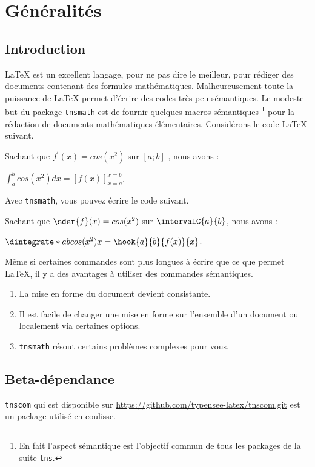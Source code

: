 \documentclass[12pt,a4paper]{book}
\begin{document}
\chapter{Généralités}

\section{Introduction}

\LaTeX{} est un excellent langage, pour ne pas dire le meilleur, pour rédiger des documents contenant des formules mathématiques.
Malheureusement toute la puissance de \LaTeX{} permet d'écrire des codes très peu sémantiques.
Le modeste but du package \verb+tnsmath+ est de fournir quelques macros sémantiques
\footnote{
	En fait l'aspect sémantique est l'objectif commun de tous les packages de la suite \texttt{tns}.
}
pour la rédaction de documents mathématiques élémentaires. Considérons le code \LaTeX{} suivant.

\begin{latexex-alone}
Sachant que $f^\prime(x) = cos(x^2)$ sur $[a ; b]$ , nous avons :

$\displaystyle \int_a^b cos(x^2) dx = \left[ f(x) \right]_{x=a}^{x=b}$.
\end{latexex-alone}


Avec \verb+tnsmath+, vous pouvez écrire le code suivant.

\begin{latexex-alone}
Sachant que $\sder{f}(x) = cos(x^2)$ sur $\intervalC{a}{b}$, nous avons :

$\dintegrate*{a}{b}{cos(x^2)}{x} = \hook{a}{b}{f(x)}{x}$.
\end{latexex-alone}


Même si certaines commandes sont plus longues à écrire que ce que permet \LaTeX{}, il y a des avantages à utiliser des commandes sémantiques.
\begin{enumerate}
	\item La mise en forme du document devient consistante.

	\item Il est facile de changer une mise en forme sur l'ensemble d'un document ou localement via certaines options.

	\item \verb+tnsmath+ résout certains problèmes \og complexes \fg{} pour vous.
\end{enumerate}




\section{Beta-dépendance}

\verb#tnscom# qui est disponible sur \url{https://github.com/typensee-latex/tnscom.git} est un package utilisé en coulisse.
\end{document}
